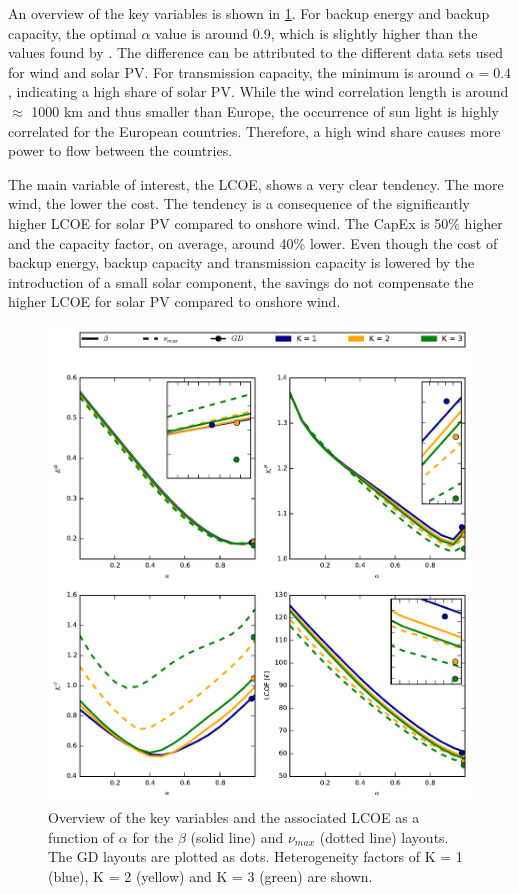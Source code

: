 \documentclass[a4paper, 5p, sort&compress]{elsarticle}%
\begin{document}
An overview of the key variables is shown in \cref{fig:overview}. For
backup energy and backup capacity, the optimal $\alpha$ value is around
0.9, which is slightly higher than the values found by
\cite{Heide2010,Heide2011}. The difference can be attributed to the
different data sets used for wind and solar PV. For transmission
capacity, the minimum is around $\alpha = 0.4$, indicating a high share of
solar PV. While the wind correlation length is around $\approx$ 1000
km \cite{Widen2011} and thus smaller than Europe, the occurrence of
sun light is highly correlated for the European countries.
Therefore, a high wind share causes more power to flow
between the countries.

The main variable of interest, the LCOE, shows a very clear
tendency. The more wind, the lower the cost. The tendency is a
consequence of the significantly higher LCOE for solar PV compared to
onshore wind. The CapEx is 50\% higher and the capacity factor, on
average, around 40\% lower. Even though the cost of backup energy,
backup capacity and transmission capacity is lowered by the
introduction of a small solar component, the savings do not compensate
the higher LCOE for solar PV compared to onshore wind.

\begin{figure}[p]
  \centering
  \includegraphics[width = 2 \columnwidth]{data}
  \caption{Overview of the key variables and the associated LCOE as a
    function of $\alpha$ for the $\beta$ (solid line) and $\nu_{max}$ (dotted
    line) layouts. The GD layouts are plotted as dots. Heterogeneity
    factors of K = 1 (blue), K = 2 (yellow) and K = 3 (green) are
    shown.}
  \label{fig:overview}
\end{figure}
\end{document}
